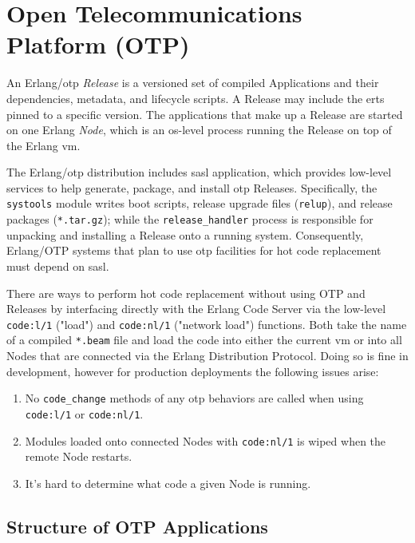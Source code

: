 \chapter{Open Telecommunications Platform (OTP)}


An Erlang/\acrshort{otp} \emph{Release} is a versioned set of compiled Applications and their dependencies, metadata, and lifecycle scripts. A Release may include the \acrfull{erts} pinned to a specific version. The applications that make up a Release are started on one Erlang \emph{Node}, which is an \acrshort{os}-level process running the Release on top of the Erlang \acrshort{vm}.

The Erlang/\acrshort{otp} distribution includes \acrfull{sasl} application, which provides low-level services to help generate, package, and install \acrshort{otp} Releases. Specifically, the \lstinline|systools| module writes boot scripts, release upgrade files (\lstinline|relup|), and release packages (\lstinline|*.tar.gz|); while the \lstinline|release_handler| process is responsible for unpacking and installing a Release onto a running system. Consequently, Erlang/OTP systems that plan to use \acrshort{otp} facilities for hot code replacement must depend on \acrshort{sasl}.


There are ways to perform hot code replacement without using OTP and Releases by interfacing directly with the Erlang Code Server via the low-level \lstinline|code:l/1| ("load") and \lstinline|code:nl/1| ("network load") functions. Both take the name of a compiled \lstinline|*.beam| file and load the code into either the current \acrshort{vm} or into all Nodes that are connected via the Erlang Distribution Protocol. Doing so is fine in development, however for production deployments the following issues arise:

\begin{enumerate}
\item No \lstinline|code_change| methods of any \acrshort{otp} behaviors are called when using \lstinline|code:l/1| or \lstinline|code:nl/1|.
\item Modules loaded onto connected Nodes with \lstinline|code:nl/1| is wiped when the remote Node restarts.
\item It's hard to determine what code a given Node is running.
\end{enumerate}


\section{Structure of OTP Applications}

